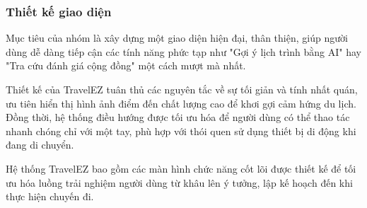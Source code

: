 \subsubsection{Thiết kế giao diện}
Mục tiêu của nhóm là xây dựng một giao diện hiện đại, thân thiện, giúp người dùng dễ dàng tiếp cận các tính năng phức tạp như "Gợi ý lịch trình bằng AI" hay "Tra cứu đánh giá cộng đồng" một cách mượt mà nhất.

Thiết kế của TravelEZ tuân thủ các nguyên tắc về sự tối giản và tính nhất quán, ưu tiên hiển thị hình ảnh điểm đến chất lượng cao để khơi gợi cảm hứng du lịch. Đồng thời, hệ thống điều hướng được tối ưu hóa để người dùng có thể thao tác nhanh chóng chỉ với một tay, phù hợp với thói quen sử dụng thiết bị di động khi đang di chuyển.

Hệ thống TravelEZ bao gồm các màn hình chức năng cốt lõi được thiết kế để tối ưu hóa luồng trải nghiệm người dùng từ khâu lên ý tưởng, lập kế hoạch đến khi thực hiện chuyến đi.

